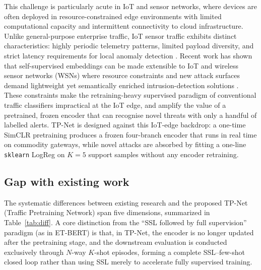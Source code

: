 \documentclass[sensors,article,submit,moreauthors]{Definitions/mdpi}
\begin{document}
This challenge is particularly acute in IoT and sensor networks, where devices are often deployed in resource-constrained edge environments with limited computational capacity and intermittent connectivity to cloud infrastructure. Unlike general-purpose enterprise traffic, IoT sensor traffic exhibits distinct characteristics: highly periodic telemetry patterns, limited payload diversity, and strict latency requirements for local anomaly detection \cite{liu2025iot}. Recent work has shown that self-supervised embeddings can be made extensible to IoT and wireless sensor networks (WSNs) where resource constraints and new attack surfaces demand lightweight yet semantically enriched intrusion-detection solutions \cite{liu2025iot}. These constraints make the retraining-heavy supervised paradigm of conventional traffic classifiers impractical at the IoT edge, and amplify the value of a pretrained, frozen encoder that can recognise novel threats with only a handful of labelled alerts. TP-Net is designed against this IoT-edge backdrop: a one-time SimCLR pretraining produces a frozen four-branch encoder that runs in real time on commodity gateways, while novel attacks are absorbed by fitting a one-line \texttt{sklearn} LogReg on $K = 5$ support samples without any encoder retraining.

\subsection{Gap with existing work}
\label{sec:gap}

The systematic differences between existing research and the proposed TP-Net (Traffic Pretraining Network) span five dimensions, summarized in Table~\ref{tab:diff}. A core distinction from the ``SSL followed by full supervision'' paradigm (as in ET-BERT) is that, in TP-Net, the encoder is no longer updated after the pretraining stage, and the downstream evaluation is conducted exclusively through $N$-way $K$-shot episodes, forming a complete SSL--few-shot closed loop rather than using SSL merely to accelerate fully supervised training.
\end{document}
